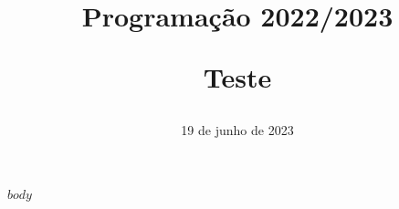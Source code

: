 \documentclass[]{article}
\begin{document}
\title{
    \centering %
    
    Programação 2022/2023
    
    Teste
}

\date{19 de junho de 2023}

\maketitle
\thispagestyle{firstpage}


$body$
\end{document}
